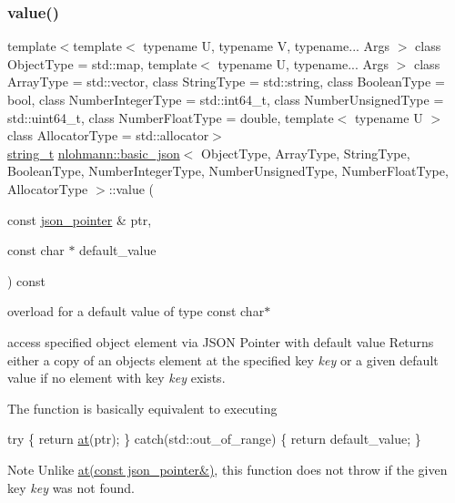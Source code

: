 \subsubsection{\texorpdfstring{value()}{value()}\hspace{0.1cm}{\footnotesize\ttfamily [4/4]}}
{\footnotesize\ttfamily template$<$template$<$ typename U, typename V, typename... Args $>$ class Object\+Type = std\+::map, template$<$ typename U, typename... Args $>$ class Array\+Type = std\+::vector, class String\+Type  = std\+::string, class Boolean\+Type  = bool, class Number\+Integer\+Type  = std\+::int64\+\_\+t, class Number\+Unsigned\+Type  = std\+::uint64\+\_\+t, class Number\+Float\+Type  = double, template$<$ typename U $>$ class Allocator\+Type = std\+::allocator$>$ \\
\hyperlink{classnlohmann_1_1basic__json_ab63e618bbb0371042b1bec17f5891f42}{string\+\_\+t} \hyperlink{classnlohmann_1_1basic__json}{nlohmann\+::basic\+\_\+json}$<$ Object\+Type, Array\+Type, String\+Type, Boolean\+Type, Number\+Integer\+Type, Number\+Unsigned\+Type, Number\+Float\+Type, Allocator\+Type $>$\+::value (\begin{DoxyParamCaption}\item[{const \hyperlink{classnlohmann_1_1basic__json_1_1json__pointer}{json\+\_\+pointer} \&}]{ptr,  }\item[{const char $\ast$}]{default\+\_\+value }\end{DoxyParamCaption}) const\hspace{0.3cm}{\ttfamily [inline]}}



overload for a default value of type const char$\ast$ 

access specified object element via J\+S\+ON Pointer with default value Returns either a copy of an object\textquotesingle{}s element at the specified key {\itshape key} or a given default value if no element with key {\itshape key} exists.

The function is basically equivalent to executing 
\begin{DoxyCode}
\textcolor{keywordflow}{try} \{
    \textcolor{keywordflow}{return} \hyperlink{classnlohmann_1_1basic__json_a214a8c22d616fd3567b88932c07436c9}{at}(ptr);
\} \textcolor{keywordflow}{catch}(std::out\_of\_range) \{
    \textcolor{keywordflow}{return} default\_value;
\}
\end{DoxyCode}


\begin{DoxyNote}{Note}
Unlike \hyperlink{classnlohmann_1_1basic__json_a649aef71e5d952499da7ad3b8e7c9236}{at(const json\+\_\+pointer\&)}, this function does not throw if the given key {\itshape key} was not found.
\end{DoxyNote}


